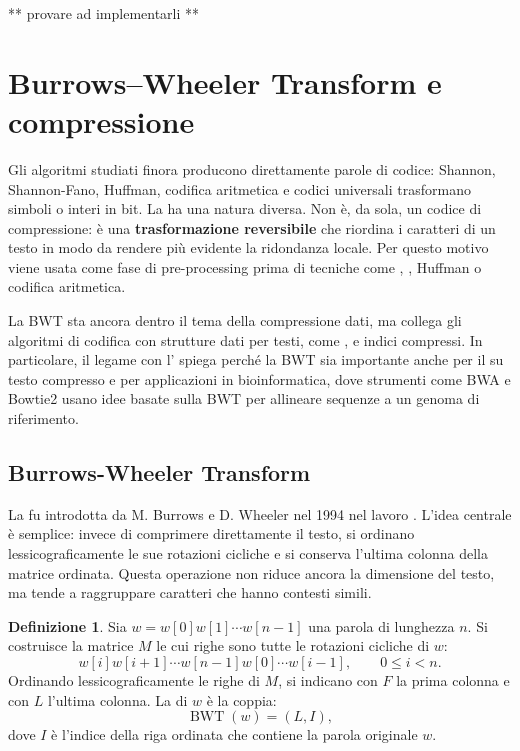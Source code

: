 \documentclass{article}
\theoremstyle{definition}
\newtheorem{definizione}{Definizione}[section]
\numberwithin{equation}{section}
\begin{document}
** provare ad implementarli **


\section{Burrows--Wheeler Transform e compressione}
Gli algoritmi studiati finora producono direttamente parole di codice: Shannon, Shannon-Fano, Huffman, codifica aritmetica e codici universali trasformano simboli o interi in bit. La \textbf{} ha una natura diversa. Non è, da sola, un codice di compressione: è una \textbf{trasformazione reversibile} che riordina i caratteri di un testo in modo da rendere più evidente la ridondanza locale. Per questo motivo viene usata come fase di pre-processing prima di tecniche come , , Huffman o codifica aritmetica.

La BWT sta ancora dentro il tema della compressione dati, ma collega gli algoritmi di codifica con strutture dati per testi, come \textbf{}, \textbf{} e indici compressi. In particolare, il legame con l'\textbf{} spiega perché la BWT sia importante anche per il  su testo compresso e per applicazioni in bioinformatica, dove strumenti come BWA e Bowtie2 usano idee basate sulla BWT per allineare sequenze a un genoma di riferimento.

\subsection{Burrows-Wheeler Transform}
La  fu introdotta da M. Burrows e D. Wheeler nel 1994 nel lavoro \emph{}. L'idea centrale è semplice: invece di comprimere direttamente il testo, si ordinano lessicograficamente le sue rotazioni cicliche e si conserva l'ultima colonna della matrice ordinata. Questa operazione non riduce ancora la dimensione del testo, ma tende a raggruppare caratteri che hanno contesti simili.

\begin{definizione}
    Sia $w=w[0]w[1]\cdots w[n-1]$ una parola di lunghezza $n$. Si costruisce la matrice $M$ le cui righe sono tutte le rotazioni cicliche di $w$:
    \[
        w[i]w[i+1]\cdots w[n-1]w[0]\cdots w[i-1],
        \qquad
        0\leq i<n.
    \]
    Ordinando lessicograficamente le righe di $M$, si indicano con $F$ la prima colonna e con $L$ l'ultima colonna. La \textbf{} di $w$ è la coppia:
    \[
        \operatorname{BWT}(w)=(L,I),
    \]
    dove $I$ è l'indice della riga ordinata che contiene la parola originale $w$.
\end{definizione}
\end{document}
